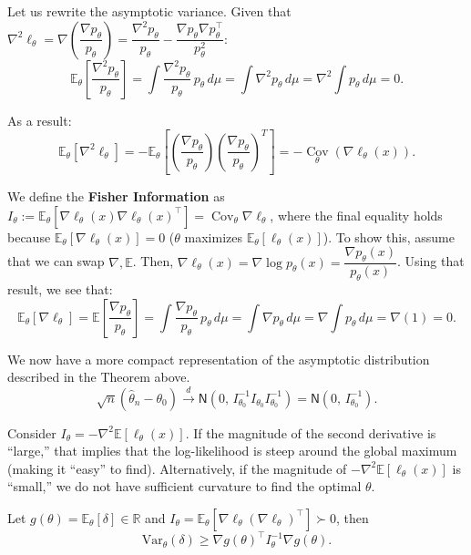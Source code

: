 \begin{rem}
Let us rewrite the asymptotic variance. Given that 
$\nabla^2 \ell_\theta = \nabla\!\left(\dfrac{\nabla p_\theta}{p_\theta}\right) 
= \dfrac{\nabla^2 p_\theta}{p_\theta} - \dfrac{\nabla p_\theta \nabla p_\theta^\top}{p_\theta^2}$:
\[
  \mathbb{E}_\theta\!\left[\frac{\nabla^2 p_\theta}{p_\theta}\right] 
  = \int \frac{\nabla^2 p_\theta}{p_\theta}\, p_\theta\, d\mu 
  = \int \nabla^2 p_\theta\, d\mu 
  = \nabla^2 \int p_\theta\, d\mu = 0.
\]

As a result:
\[
  \mathbb{E}_\theta[\nabla^2 \ell_\theta] 
  = -\mathbb{E}_\theta\!\left[\left(\frac{\nabla p_\theta}{p_\theta}\right)
  \!\left(\frac{\nabla p_\theta}{p_\theta}\right)^{\!T}\right] 
  = -\operatorname*{Cov}_\theta(\nabla \ell_\theta(x)).
\]

We define the \textbf{Fisher Information} as 
$I_\theta := \mathbb{E}_\theta[\nabla \ell_\theta(x)\nabla \ell_\theta(x)^\top] 
= \operatorname*{Cov}_\theta \nabla \ell_\theta$, where the final equality holds 
because $\mathbb{E}_\theta[\nabla \ell_\theta(x)] = 0$ ($\theta$ maximizes 
$\mathbb{E}_\theta[\ell_\theta(x)]$). To show this, assume that we can swap 
$\nabla, \mathbb{E}$. Then, $\nabla \ell_\theta(x) = \nabla \log p_\theta(x) 
= \dfrac{\nabla p_\theta(x)}{p_\theta(x)}$. Using that result, we see that:
\[
  \mathbb{E}_\theta[\nabla \ell_\theta] 
  = \mathbb{E}\!\left[\frac{\nabla p_\theta}{p_\theta}\right] 
  = \int \frac{\nabla p_\theta}{p_\theta}\, p_\theta\, d\mu 
  = \int \nabla p_\theta\, d\mu 
  = \nabla \int p_\theta\, d\mu 
  = \nabla(1) = 0.
\]

We now have a more compact representation of the asymptotic distribution described 
in the Theorem above.
\[
  \sqrt{n}(\hat{\theta}_n - \theta_0) \xrightarrow{d} 
  \mathsf{N}(0,\, I_{\theta_0}^{-1} I_{\theta_0} I_{\theta_0}^{-1}) 
  = \mathsf{N}(0,\, I_{\theta_0}^{-1}).
\]

Consider $I_\theta = -\nabla^2 \mathbb{E}[\ell_\theta(x)]$. If the magnitude of the 
second derivative is ``large,'' that implies that the log-likelihood is steep around 
the global maximum (making it ``easy'' to find). Alternatively, if the magnitude of 
$-\nabla^2 \mathbb{E}[\ell_\theta(x)]$ is ``small,'' we do not have sufficient 
curvature to find the optimal $\theta$.
\end{rem}

\begin{thm}
Let $g(\theta) = \mathbb{E}_\theta[\delta] \in \mathbb{R}$ and 
$I_\theta = \mathbb{E}_\theta[\nabla \ell_\theta (\nabla \ell_\theta)^\top] \succ 0$, then
\[
  \mathrm{Var}_\theta(\delta) \ge \nabla g(\theta)^\top I_\theta^{-1} \nabla g(\theta).
\]
\end{thm}

